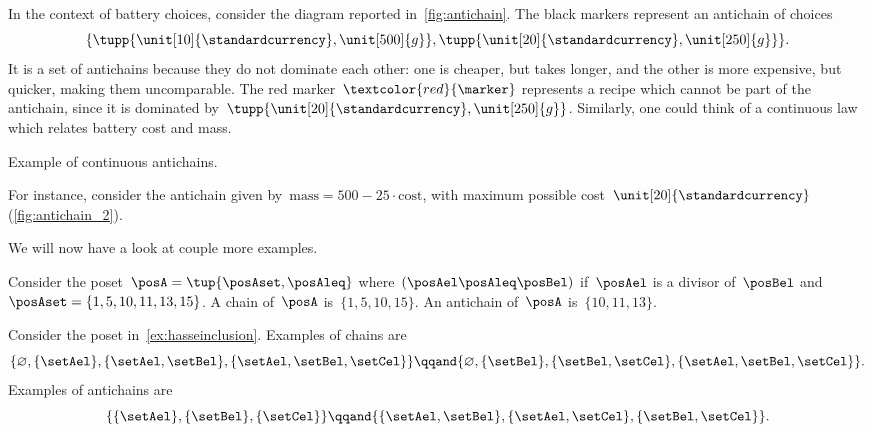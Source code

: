 In the context of battery choices, consider the diagram reported in~\cref{fig:antichain}.
The black markers represent an antichain of choices
\begin{equation}
	\{
	\tupp{\unit[10]{\standardcurrency},\unit[500]{g}},
	\tupp{\unit[20]{\standardcurrency},\unit[250]{g}}
	\}.
\end{equation}
It is a set of antichains because they do not dominate each other: one is cheaper, but takes longer, and the other is more expensive, but quicker, making them uncomparable.
The red marker~$\textcolor{red}{\marker}$ represents a recipe which cannot be part of the antichain, since it is dominated by~$\tupp{\unit[20]{\standardcurrency},\unit[250]{g}}$.
Similarly, one could think of a continuous law which relates battery cost and mass.
%
\begin{marginfigure}
	\centering
	\caption{Example of continuous antichains.}
	\label{fig:antichain_2}
\end{marginfigure}
%
For instance, consider the antichain given by~$\text{mass}=500-25\cdot \text{cost}$, with maximum possible cost~$\unit[20]{\standardcurrency}$ (\cref{fig:antichain_2}).

We will now have a look at couple more examples.
\begin{example}
	Consider the poset~$\posA=\tup{\posAset,\posAleq}$ where~$(\posAel \posAleq \posBel)$ if~$\posAel$ is a divisor of~$\posBel$ and~$\posAset=\{1,5,10,11,13,15\}$.
	A chain of~$\posA$ is~$\{1,5,10,15\}$.
	An antichain of~$\posA$ is~$\{10,11,13\}$.
\end{example}

\begin{example}
	Consider the poset in~\cref{ex:hasseinclusion}.
	Examples of chains are
	\begin{equation}
		\{\varnothing,\{\setAel\},\{\setAel,\setBel\},\{\setAel,\setBel,\setCel\}\}
		\qqand
		\{\varnothing,\{\setBel\},\{\setBel,\setCel\},\{\setAel,\setBel,\setCel\}\}.
	\end{equation}
	Examples of antichains are
	\begin{equation}
		\{\{\setAel\},\{\setBel\},\{\setCel\}\}
		\qqand
		\{ \{\setAel,\setBel\},\{\setAel,\setCel\}, \{\setBel,\setCel\}\}.
	\end{equation}
\end{example}
